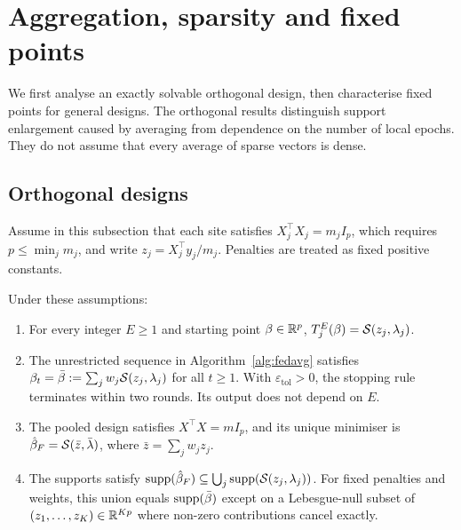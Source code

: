 \section{Aggregation, sparsity and fixed points}
\label{sec:theory}

We first analyse an exactly solvable orthogonal design, then characterise
fixed points for general designs. The orthogonal results distinguish
support enlargement caused by averaging from dependence on the number of
local epochs. They do not assume that every average of sparse vectors is
dense.

\subsection{Orthogonal designs}

Assume in this subsection that each site satisfies
$X_j^\top X_j=m_j I_p$, which requires $p\le\min_j m_j$, and write
$z_j=X_j^\top y_j/m_j$. Penalties are treated as fixed positive constants.

\begin{proposition}
\label{prop:orth}
Under these assumptions:
\begin{enumerate}
\item[(i)] For every integer $E\ge1$ and starting point $\beta\in\mathbb{R}^p$,
 $T_j^E(\beta)=\mathcal{S}(z_j,\lambda_j)$.
\item[(ii)] The unrestricted sequence in Algorithm~\ref{alg:fedavg} satisfies
 $\beta_t=\bar{\beta}:=\sum_jw_j\mathcal{S}(z_j,\lambda_j)$ for all $t\ge1$.
 With $\varepsilon_{\mathrm{tol}}>0$, the stopping rule terminates within
 two rounds. Its output does not depend on $E$.
\item[(iii)] The pooled design satisfies $X^\top X=mI_p$, and its unique
 minimiser is $\hat{\beta}_F=\mathcal{S}(\bar z,\bar\lambda)$, where
 $\bar z=\sum_jw_jz_j$.
\item[(iv)] The supports satisfy
 $\operatorname{supp}(\hat{\beta}_F)\subseteq\bigcup_j\operatorname{supp}(\mathcal{S}(z_j,\lambda_j))$.
 For fixed penalties and weights, this union equals $\operatorname{supp}(\bar{\beta})$ except
 on a Lebesgue-null subset of $(z_1,\ldots,z_K)\in\mathbb{R}^{Kp}$ where non-zero
 contributions cancel exactly.
\end{enumerate}
\end{proposition}

